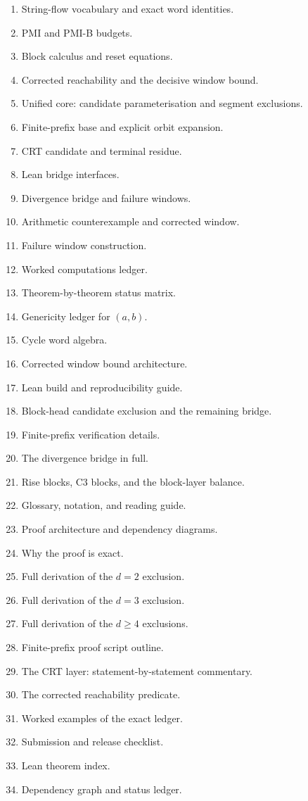 \documentclass[11pt]{article}
\theoremstyle{plain}
\begin{document}
\begin{enumerate}[leftmargin=*]
\item String-flow vocabulary and exact word identities.
\item PMI and PMI-B budgets.
\item Block calculus and reset equations.
\item Corrected reachability and the decisive window bound.
\item Unified core: candidate parameterisation and segment exclusions.
\item Finite-prefix base and explicit orbit expansion.
\item CRT candidate and terminal residue.
\item Lean bridge interfaces.
\item Divergence bridge and failure windows.
\item Arithmetic counterexample and corrected window.
\item Failure window construction.
\item Worked computations ledger.
\item Theorem-by-theorem status matrix.
\item Genericity ledger for $(a,b)$.
\item Cycle word algebra.
\item Corrected window bound architecture.
\item Lean build and reproducibility guide.
\item Block-head candidate exclusion and the remaining bridge.
\item Finite-prefix verification details.
\item The divergence bridge in full.
\item Rise blocks, C3 blocks, and the block-layer balance.
\item Glossary, notation, and reading guide.
\item Proof architecture and dependency diagrams.
\item Why the proof is exact.
\item Full derivation of the $d=2$ exclusion.
\item Full derivation of the $d=3$ exclusion.
\item Full derivation of the $d\ge4$ exclusions.
\item Finite-prefix proof script outline.
\item The CRT layer: statement-by-statement commentary.
\item The corrected reachability predicate.
\item Worked examples of the exact ledger.
\item Submission and release checklist.
\item Lean theorem index.
\item Dependency graph and status ledger.
\end{enumerate}
\end{document}
